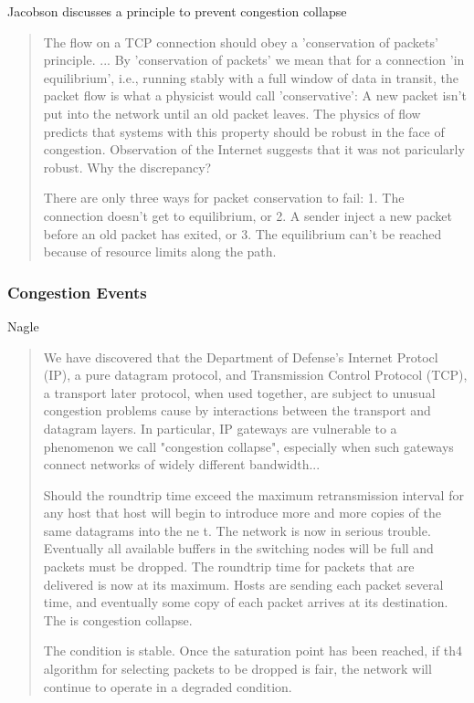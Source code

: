 Jacobson \cite{jacobson1988} discusses a principle to prevent congestion collapse

\begin{quote}
    The flow on a TCP connection should obey a 'conservation of packets' principle. ... By
    'conservation of packets' we mean that for a connection 'in equilibrium', i.e., running stably
    with a full window of data in transit, the packet flow is what a physicist would call
    'conservative': A new packet isn't put into the network until an old packet leaves. The physics
    of flow predicts that systems with this property should be robust in the face of congestion.
    Observation of the Internet suggests that it was not paricularly robust. Why the discrepancy?

    There are only three ways for packet conservation to fail:
    1. The connection doesn't get to equilibrium, or
    2. A sender inject a new packet before an old packet has exited, or
    3. The equilibrium can't be reached because of resource limits along the path.
\end{quote}




\subsubsection{Congestion Events}

Nagle \cite{rfc896}

\begin{quote}
We have discovered that the Department of Defense's Internet Protocl (IP), a pure datagram protocol,
and Transmission Control Protocol (TCP), a transport later protocol, when used together, are
subject to unusual congestion problems cause by interactions between the transport and datagram
layers. In particular, IP gateways are vulnerable to a phenomenon we call "congestion collapse",
especially when such gateways connect networks of widely different bandwidth...

Should the roundtrip time exceed the maximum retransmission interval for any host that host will
begin to introduce more and more copies of the same datagrams into the ne t. The network is now
in serious trouble. Eventually all available buffers in the switching nodes will be full and
packets must be dropped. The roundtrip time for packets that are delivered is now at its
maximum. Hosts are sending each packet several time, and eventually some copy of each packet
arrives at its destination. The is congestion collapse.

The condition is stable. Once the saturation point has been reached, if th4 algorithm for selecting
packets to be dropped is fair, the network will continue to operate in a degraded condition.
\end{quote}

